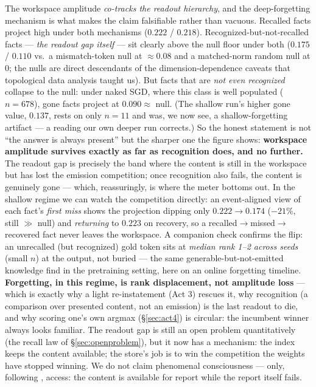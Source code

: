 \documentclass[11pt]{article}
\begin{document}
The workspace amplitude \emph{co-tracks the readout hierarchy}, and the deep-forgetting mechanism
is what makes the claim falsifiable rather than vacuous. Recalled facts project high under both
mechanisms ($0.222$ / $0.218$). Recognized-but-not-recalled facts --- \emph{the readout gap itself}
--- sit clearly above the null floor under both ($0.175$ / $0.110$ vs.\ a mismatch-token null at
$\approx0.08$ and a matched-norm random null at $0$; the nulls are direct descendants of the
dimension-dependence caveats that topological data analysis taught us). But facts that are \emph{not even recognized}
collapse to the null: under naked SGD, where this class is well populated ($n\!=\!678$), gone facts
project at $0.090\approx$ null. (The shallow run's higher gone value, $0.137$, rests on only
$n\!=\!11$ and was, we now see, a shallow-forgetting artifact --- a reading our own deeper run
corrects.) So the honest statement is not ``the answer is always present'' but the sharper one the
figure shows: \textbf{workspace amplitude survives exactly as far as recognition does, and no
further.} The readout gap is precisely the band where the content is still in the workspace but has
lost the emission competition; once recognition also fails, the content is genuinely gone --- which,
reassuringly, is where the meter bottoms out. In the shallow regime we can watch the competition
directly: an event-aligned view of each fact's \emph{first miss} shows the projection dipping only
$0.222\!\to\!0.174$ ($-21\%$, still $\gg$ null) and \emph{returning} to $0.223$ on recovery, so a
recalled$\to$missed$\to$recovered fact never leaves the workspace. A companion check confirms the
flip: an unrecalled (but recognized) gold token sits at \emph{median rank 1--2 across seeds}
(small $n$) at the output, not
buried --- the same generable-but-not-emitted knowledge \citet{insideout2025} find in the
pretraining setting, here on an online forgetting timeline. \textbf{Forgetting, in this regime, is rank displacement, not amplitude loss} --- which
is exactly why a light re-instatement (Act 3) rescues it, why recognition (a comparison over
presented content, not an emission) is the last readout to die, and why scoring one's own argmax
(\S\ref{sec:act4}) is circular: the incumbent winner always looks familiar. The readout gap is
still an open problem quantitatively (the recall law of \S\ref{sec:openproblem}), but it now has a
mechanism: the index keeps the content available; the store's job is to win the competition the
weights have stopped winning. We do not claim phenomenal consciousness --- only, following
\citet{jspace2026}, access: the content is available for report while the report itself fails.
\end{document}
